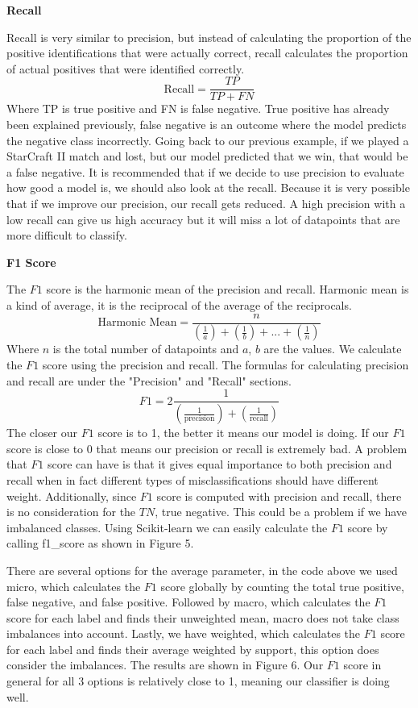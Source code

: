 \documentclass[a4paper,12pt]{report}
\newcommand{\msection}[1]{\noindent\textbf{#1}}
\begin{document}
\msection{Recall}

Recall is very similar to precision, but instead of calculating the proportion of the positive identifications that were actually correct, recall calculates the proportion of actual positives that were identified correctly.
$$\text{Recall}=\frac{TP}{TP+FN}$$
Where TP is true positive and FN is false negative. True positive has already been explained previously, false negative is an outcome where the model predicts the negative class incorrectly. Going back to our previous example, if we played a StarCraft II match and lost, but our model predicted that we win, that would be a false negative. It is recommended that if we decide to use precision to evaluate how good a model is, we should also look at the recall. Because it is very possible that if we improve our precision, our recall gets reduced. A high precision with a low recall can give us high accuracy but it will miss a lot of datapoints that are more difficult to classify.
 
\msection{F1 Score}

The $F1$ score is the harmonic mean of the precision and recall. Harmonic mean is a kind of average, it is the reciprocal of the average of the reciprocals.
$$\text{Harmonic Mean}=\frac{n}{(\frac{1}{a})+(\frac{1}{b})+...+(\frac{1}{n})}$$
Where $n$ is the total number of datapoints and $a$, $b$ are the values.
We calculate the $F1$ score using the precision and recall. The formulas for calculating precision and recall are under the "Precision" and "Recall" sections. 
$$F1=2\frac{1}{(\frac{1}{\text{precision}})+(\frac{1}{\text{recall}})}$$
The closer our $F1$ score is to 1, the better it means our model is doing. If our $F1$ score is close to 0 that means our precision or recall is extremely bad. A problem that $F1$ score can have is that it gives equal importance to both precision and recall when in fact different types of misclassifications should have different weight. Additionally, since $F1$ score is computed with precision and recall, there is no consideration for the $TN$, true negative. This could be a problem if we have imbalanced classes. Using Scikit-learn we can easily calculate the $F1$ score by calling f1\_score as shown in Figure 5.


There are several options for the average parameter, in the code above we used micro, which calculates the $F1$ score globally by counting the total true positive, false negative, and false positive. Followed by macro, which calculates the $F1$ score for each label and finds their unweighted mean, macro does not take class imbalances into account. Lastly, we have weighted, which calculates the $F1$ score for each label and finds their average weighted by support, this option does consider the imbalances. The results are shown in Figure 6. Our $F1$ score in general for all 3 options is relatively close to 1, meaning our classifier is doing well.
\end{document}
